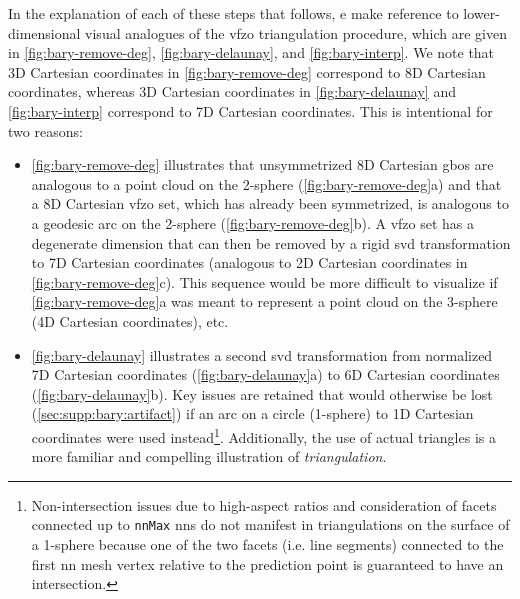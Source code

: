 \documentclass[final,twocolumn,12pt]{elsarticle}
\newcommand{\outpt}{prediction}
\begin{document}
{\begin{appendices}
In the explanation of each of these steps that follows, e make reference to lower-dimensional visual analogues of the \gls{vfzo} triangulation procedure, which are given in \cref{fig:bary-remove-deg}, \cref{fig:bary-delaunay}, and \cref{fig:bary-interp}. We note that 3D Cartesian coordinates in \cref{fig:bary-remove-deg} correspond to 8D Cartesian coordinates, whereas 3D Cartesian coordinates in \cref{fig:bary-delaunay} and \cref{fig:bary-interp} correspond to 7D Cartesian coordinates. This is intentional for two reasons:
\begin{itemize}
    \item \cref{fig:bary-remove-deg} illustrates that unsymmetrized 8D Cartesian \glspl{gbo} are analogous to a point cloud on the 2-sphere (\cref{fig:bary-remove-deg}a) and that a 8D Cartesian \gls{vfzo} set, which has already been symmetrized, is analogous to a geodesic arc on the 2-sphere (\cref{fig:bary-remove-deg}b). A \gls{vfzo} set has a degenerate dimension that can then be removed by a rigid \gls{svd} transformation to 7D Cartesian coordinates (analogous to 2D Cartesian coordinates in \cref{fig:bary-remove-deg}c). This sequence would be more difficult to visualize if \cref{fig:bary-remove-deg}a was meant to represent a point cloud on the 3-sphere (4D Cartesian coordinates), etc.
    \item \cref{fig:bary-delaunay} illustrates a second \gls{svd} transformation from normalized 7D Cartesian coordinates (\cref{fig:bary-delaunay}a) to 6D Cartesian coordinates (\cref{fig:bary-delaunay}b). Key issues are retained that would otherwise be lost (\cref{sec:supp:bary:artifact}) if an arc on a circle (1-sphere) to 1D Cartesian coordinates were used instead\footnote{Non-intersection issues due to high-aspect ratios and consideration of facets connected up to \texttt{nnMax} \glspl{nn} do not manifest in triangulations on the surface of a 1-sphere because one of the two facets (i.e. line segments) connected to the first \gls{nn} mesh vertex relative to the \outpt{} point is guaranteed to have an intersection.}. Additionally, the use of actual triangles is a more familiar and compelling illustration of \textit{triangulation}.
\end{itemize}


\end{appendices}}
\end{document}
